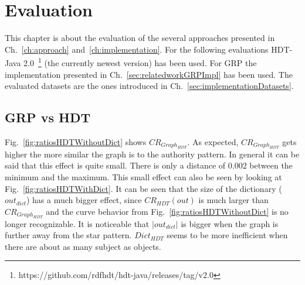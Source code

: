 \chapter{Evaluation}\label{ch:evaluation}

This chapter is about the evaluation of the several approaches presented in Ch.~\ref{ch:approach} and~\ref{ch:implementation}. For the following evaluations HDT-Java 2.0~\footnote{\label{foot:1}https://github.com/rdfhdt/hdt-java/releases/tag/v2.0} (the currently newest version) has been used. For GRP the implementation presented in Ch.~\ref{sec:relatedworkGRPImpl} has been used. The evaluated datasets are the ones introduced in Ch.~\ref{sec:implementationDatasets}.

\section{GRP vs HDT}\label{sec:evaluationHDTvsGRP}


Fig.~\ref{fig:ratiosHDTWithoutDict} shows $CR_{Graph_{HDT}}$. As expected, $CR_{Graph_{HDT}}$ gets higher the more similar the graph is to the authority pattern. In general it can be said that this effect is quite small. There is only a distance of 0.002 between the minimum and the maximum. This small effect can also be seen by looking at Fig.~\ref{fig:ratiosHDTWithDict}. It can be seen that the size of the dictionary ($out_{dict}$) has a much bigger effect, since $CR_{HDT}(out)$ is much larger than $CR_{Graph_{HDT}}$ and the curve behavior from Fig.~\ref{fig:ratiosHDTWithoutDict} is no longer recognizable. It is noticeable that $|out_{dict}|$ is bigger when the graph is further away from the star pattern. $Dict_{HDT}$ seems to be more inefficient when there are about as many subject as objects. 

